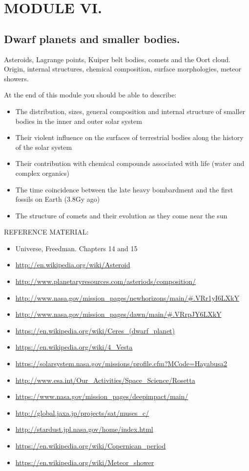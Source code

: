 \section{MODULE VI.}
\subsection{Dwarf planets and smaller bodies.}

Asteroids, Lagrange points, Kuiper belt bodies, comets and the Oort cloud. Origin, internal structures, chemical composition, surface morphologies, meteor showers.

At the end of this module you should be able to describe: 

\begin{itemize}
\item  The distribution, sizes, general composition and internal
structure of smaller bodies in the inner and outer solar system
\item  Their violent influence on the surfaces of terrestrial bodies along the history of the solar system
\item  Their contribution with chemical compounds associated with life (water and complex organics)
\item  The time coincidence between the late heavy bombardment and the first fossils on Earth (3.8Gy ago)
\item  The structure of comets and their evolution as they come near the sun
 \end{itemize}
 
REFERENCE MATERIAL:
\begin{itemize}
\item  Universe, Freedman. Chapters 14 and 15
\item \url{http://en.wikipedia.org/wiki/Asteroid}
\item \url{http://www.planetaryresources.com/asteriods/composition/}
\item \url{http://www.nasa.gov/mission_pages/newhorizons/main/#.VRr1yI6LXkY}
\item \url{http://www.nasa.gov/mission_pages/dawn/main/#.VRrpJY6LXkY}
\item \url{https://en.wikipedia.org/wiki/Ceres_(dwarf_planet)}
\item \url{https://en.wikipedia.org/wiki/4_Vesta}
\item \url{https://solarsystem.nasa.gov/missions/profile.cfm?MCode=Hayabusa2}
\item \url{http://www.esa.int/Our_Activities/Space_Science/Rosetta}
\item \url{https://www.nasa.gov/mission_pages/deepimpact/main/}
\item \url{http://global.jaxa.jp/projects/sat/muses_c/}
\item \url{http://stardust.jpl.nasa.gov/home/index.html}
\item \url{https://en.wikipedia.org/wiki/Copernican_period}
\item \url{https://en.wikipedia.org/wiki/Meteor_shower}
\end{itemize}